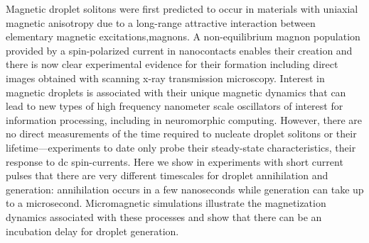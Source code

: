 Magnetic droplet solitons were first predicted to occur in materials with uniaxial magnetic anisotropy due to a long-range attractive interaction between elementary magnetic excitations,magnons. A non-equilibrium magnon population provided by a spin-polarized current in nanocontacts enables their creation and there is now clear experimental evidence for their formation including direct images obtained with scanning x-ray transmission microscopy. Interest in magnetic droplets is associated with their unique magnetic dynamics
that can lead to new types of high frequency nanometer scale oscillators of interest for information processing, including in neuromorphic computing. However, there are no direct measurements of the time required to nucleate droplet solitons or their lifetime—experiments to date only probe their steady-state characteristics, their response to dc spin-currents. Here we show in experiments with short current pulses that there are very different timescales for
droplet annihilation and generation: annihilation occurs in a few nanoseconds while generation can take up to a microsecond. Micromagnetic simulations illustrate the magnetization dynamics associated with these processes and show that there can be an incubation delay for droplet generation.
